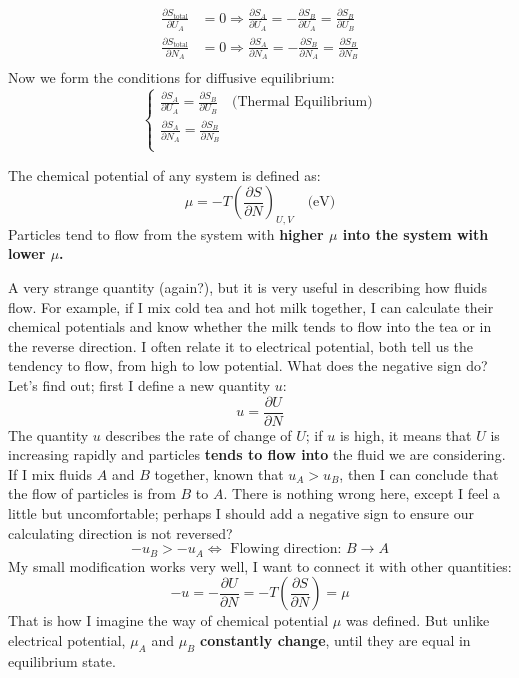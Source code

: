 \documentclass[~/PhyAI/phyai.tex]{subfiles}
\begin{document}
\begin{equation*}
	\begin{split}
		\frac{\partial S_{\text{total}} }{\partial U_{A}}&=0\Rightarrow \frac{\partial S_{A}    }{\partial U_{A}}=-\frac{\partial S_{B}}{\partial U_{A}}=\frac{\partial S_{B}}{\partial U_{B}}\\
		\frac{\partial S_{\text{total}} }{\partial N_{A}}&=0\Rightarrow \frac{\partial S_{A}    }{\partial N_{A}}=-\frac{\partial S_{B}}{\partial N_{A}}=\frac{\partial S_{B}}{\partial N_{B}}\\
	\end{split}
\end{equation*}
Now we form the conditions for diffusive equilibrium:
\begin{equation*}
	\begin{cases}
		\displaystyle\frac{\partial S_{A}}{\partial U_{A}}=\displaystyle\frac{\partial S_{B}}{\partial U_{B}}\quad\text{(Thermal Equilibrium)} \\
		\displaystyle\frac{\partial S_{A}}{\partial N_{A}}=\displaystyle\frac{\partial S_{B}}{\partial N_{B}}                                  \\
	\end{cases}
\end{equation*}
\begin{definition}
	\label{Definition of Chemical Potential}
	The chemical potential of any system is defined as:
	$$ \mu=-T\left(\frac{\partial S }{\partial N}\right)_{U,V}\quad\text{(eV)} $$
	Particles tend to flow from the system with \textbf{higher $\mu$ into the system with lower $\mu$.}
\end{definition}
A very strange quantity (again?), but it is very useful in describing how fluids flow. For example, if I mix cold tea and hot milk together, I can calculate their chemical potentials and know whether the milk tends to flow into the tea or in the reverse direction. I often relate it to electrical potential, both tell us the tendency to flow, from high to low potential. What does the negative sign do? Let's find out; first I define a new quantity $u$:
$$ u=\frac{\partial U }{\partial N} $$
The quantity $u$ describes the rate of change of $U$; if $u$ is high, it means that $U$ is increasing rapidly and particles \textbf{tends to flow into} the fluid we are considering. If I mix fluids $A$ and $B$ together, known that $u_{A}>u_{B}$, then I can conclude that the flow of particles is from $B$ to $A$. There is nothing wrong here, except I feel a little but uncomfortable; perhaps I should add a negative sign to ensure our calculating direction is not reversed?
$$ -u_{B}>-u_{A}\Leftrightarrow \text{ Flowing direction: $B\to A$} $$
My small modification works very well, I want to connect it with other quantities:
$$ -u=-\frac{\partial U }{\partial N}=-T\left(\frac{\partial S }{\partial N}\right)=\mu $$
That is how I imagine the way of chemical potential $\mu$ was defined. But unlike electrical potential, $\mu_{A}$ and $\mu_{B}$ \textbf{constantly change}, until they are equal in equilibrium state.
\end{document}
